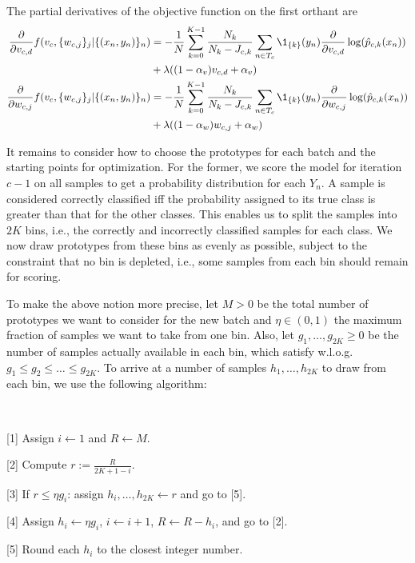 %
The partial derivatives of the objective function on the first orthant are
%
\begin{align}
\frac{\partial}{\partial v_{c,d}}f(v_c,\{w_{c,j}\}_j|\{(x_n,y_n)\}_n)
&=-\frac{1}{N}\sum_{k=0}^{K-1}\frac{N_k}{N_k-J_{c,k}}\sum_{n\in T_c}
\1_{\{k\}}(y_n)\frac{\partial}{\partial v_{c,d}}\log(\hat{p}_{c,k}(x_n))
\label{eq_l_partial_v}\\
&+\lambda((1-\alpha_v)v_{c,d}+\alpha_v)\notag\\
\frac{\partial}{\partial w_{c,j}}f(v_c,\{w_{c,j}\}_j|\{(x_n,y_n)\}_n)
&=-\frac{1}{N}\sum_{k=0}^{K-1}\frac{N_k}{N_k-J_{c,k}}\sum_{n\in T_c}
\1_{\{k\}}(y_n)\frac{\partial}{\partial w_{c,j}}\log(\hat{p}_{c,k}(x_n))
\label{eq_l_partial_w}\\
&+\lambda((1-\alpha_w)w_{c,j}+\alpha_w)\notag
\end{align}
%
\begin{center}\end{center}
%
It remains to consider how to choose the prototypes for each batch and the starting points for optimization.
For the former, we score the model for iteration $c-1$ on all samples to get a probability distribution for each $Y_n$.
A sample is considered correctly classified iff the probability assigned to its true class is greater than that for the other classes.
This enables us to split the samples into $2K$ bins, i.e., the correctly and incorrectly classified samples for each class.
We now draw prototypes from these bins as evenly as possible, subject to the constraint that no bin is depleted, i.e., some samples from each bin should remain for scoring.\par
%
To make the above notion more precise, let $M>0$ be the total number of prototypes we want to consider for the new batch and $\eta\in(0,1)$ the  maximum fraction of samples we want to take from one bin.
Also, let $g_1,\dots, g_{2K}\geq0$ be the number of samples actually available in each bin, which satisfy w.l.o.g.\ $g_1\leq g_2\leq\dots\leq g_{2K}$.
To arrive at a number of samples $h_1,\dots,h_{2K}$ to draw from each bin, we use the following algorithm:
%
\begin{samepage}
\begin{algorithm}~
\label{alg_bins}
%
\begin{description}
\item{[1]} Assign $i\leftarrow1$ and $R\leftarrow M$.
%
\item{[2]} Compute $r:=\frac{R}{2K+1-i}$.
%
\item{[3]} If $r\leq\eta g_i$: assign $h_i,\dots,h_{2K}\leftarrow r$ and go to [5].
%
\item{[4]} Assign $h_i\leftarrow\eta g_i$, $i\leftarrow i+1$, $R\leftarrow R-h_i$, and go to [2].
%
\item{[5]} Round each $h_i$ to the closest integer number.
\end{description}
\end{algorithm}
\end{samepage}
